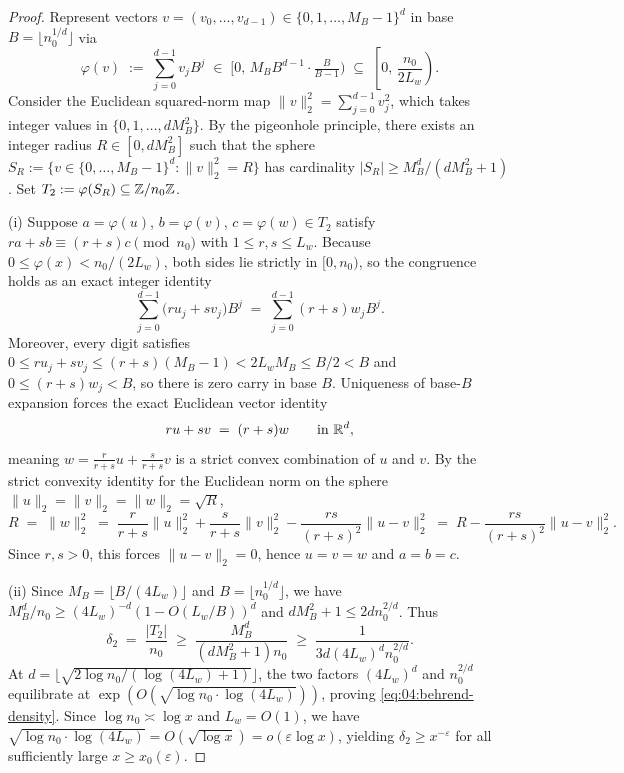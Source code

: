 
\begin{proof}
Represent vectors $v = (v_0, \dots, v_{d-1}) \in \{0, 1, \dots, M_B - 1\}^d$ in base $B = \lfloor n_0^{1/d} \rfloor$ via
\[
  \varphi(v) \;:=\; \sum_{j = 0}^{d-1} v_j B^j \;\in\; \bigl[0,\, M_B B^{d-1}\cdot \tfrac{B}{B-1}\bigr) \;\subseteq\; \left[0,\, \frac{n_0}{2 L_w}\right).
\]
Consider the Euclidean squared-norm map $\|v\|_2^2 = \sum_{j=0}^{d-1} v_j^2$, which takes integer values in $\{0, 1, \dots, d M_B^2\}$. By the pigeonhole principle, there exists an integer radius $R \in [0, d M_B^2]$ such that the sphere $S_R := \{v \in \{0, \dots, M_B - 1\}^d : \|v\|_2^2 = R\}$ has cardinality $|S_R| \ge M_B^d / (d M_B^2 + 1)$. Set $T_2 := \varphi(S_R) \subseteq \mathbb{Z}/n_0\mathbb{Z}$.

(i) Suppose $a = \varphi(u)$, $b = \varphi(v)$, $c = \varphi(w) \in T_2$ satisfy $r a + s b \equiv (r + s) c \pmod{n_0}$ with $1 \le r, s \le L_w$. Because $0 \le \varphi(x) < n_0 / (2 L_w)$, both sides lie strictly in $[0, n_0)$, so the congruence holds as an exact integer identity
\[
  \sum_{j=0}^{d-1} \bigl(r u_j + s v_j\bigr) B^j \;=\; \sum_{j=0}^{d-1} (r + s) w_j B^j.
\]
Moreover, every digit satisfies $0 \le r u_j + s v_j \le (r + s)(M_B - 1) < 2 L_w M_B \le B/2 < B$ and $0 \le (r+s)w_j < B$, so there is zero carry in base $B$. Uniqueness of base-$B$ expansion forces the exact Euclidean vector identity
\[
  r u + s v \;=\; (r + s) w \qquad \text{in } \mathbb{R}^d,
\]
meaning $w = \frac{r}{r+s} u + \frac{s}{r+s} v$ is a strict convex combination of $u$ and $v$. By the strict convexity identity for the Euclidean norm on the sphere $\|u\|_2 = \|v\|_2 = \|w\|_2 = \sqrt{R}$,
\[
  R \;=\; \|w\|_2^2 \;=\; \frac{r}{r+s}\|u\|_2^2 + \frac{s}{r+s}\|v\|_2^2 - \frac{r s}{(r+s)^2}\|u - v\|_2^2
  \;=\; R - \frac{r s}{(r+s)^2}\|u - v\|_2^2.
\]
Since $r, s > 0$, this forces $\|u - v\|_2 = 0$, hence $u = v = w$ and $a = b = c$.

(ii) Since $M_B = \lfloor B / (4 L_w) \rfloor$ and $B = \lfloor n_0^{1/d} \rfloor$, we have $M_B^d / n_0 \ge (4 L_w)^{-d}(1 - O(L_w / B))^d$ and $d M_B^2 + 1 \le 2 d n_0^{2/d}$. Thus
\[
  \delta_2 \;=\; \frac{|T_2|}{n_0} \;\ge\; \frac{M_B^d}{(d M_B^2 + 1) n_0} \;\ge\; \frac{1}{3 d (4 L_w)^d n_0^{2/d}}.
\]
At $d = \lfloor \sqrt{2 \log n_0 / (\log(4 L_w) + 1)} \rfloor$, the two factors $(4 L_w)^d$ and $n_0^{2/d}$ equilibrate at $\exp(O(\sqrt{\log n_0 \cdot \log(4 L_w)}))$, proving \eqref{eq:04:behrend-density}. Since $\log n_0 \asymp \log x$ and $L_w = O(1)$, we have $\sqrt{\log n_0 \cdot \log(4 L_w)} = O(\sqrt{\log x}) = o(\varepsilon \log x)$, yielding $\delta_2 \ge x^{-\varepsilon}$ for all sufficiently large $x \ge x_0(\varepsilon)$.
\end{proof}

